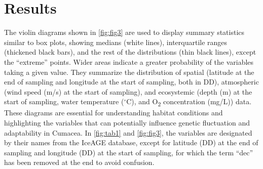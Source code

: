 \section{Results}\label{results}
The violin diagrams shown in \autoref{fig:fig3} are used to display summary statistics similar to box plots, showing medians (white lines), interquartile ranges (thickened black bars), and the rest of the distributions (thin black lines), except the ``extreme'' points. Wider areas indicate a greater probability of the variables taking a given value. They summarize the distribution of spatial (latitude at the end of sampling and longitude at the start of sampling, both in DD), atmospheric (wind speed (m/s) at the start of sampling), and ecosystemic (depth (m) at the start of sampling, water temperature ($^\circ$C), and O\textsubscript{2} concentration (mg/L)) data. These diagrams are essential for understanding habitat conditions and highlighting the variables that can potentially influence genetic fluctuation and adaptability in Cumacea. In \autoref{fig:tab1} and \autoref{fig:fig3}, the variables are designated by their names from the IceAGE database, except for latitude (DD) at the end of sampling and longitude (DD) at the start of sampling, for which the term ``dec'' has been removed at the end to avoid confusion.

